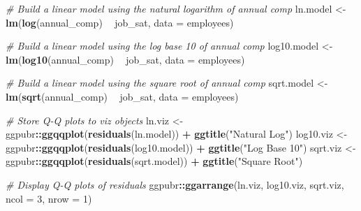 \documentclass[]{book}
\newenvironment{Shaded}{\begin{snugshade}}{\end{snugshade}}
\newcommand{\CommentTok}[1]{\textcolor[rgb]{0.56,0.35,0.01}{\textit{#1}}}
\newcommand{\DataTypeTok}[1]{\textcolor[rgb]{0.13,0.29,0.53}{#1}}
\newcommand{\DecValTok}[1]{\textcolor[rgb]{0.00,0.00,0.81}{#1}}
\newcommand{\KeywordTok}[1]{\textcolor[rgb]{0.13,0.29,0.53}{\textbf{#1}}}
\newcommand{\NormalTok}[1]{#1}
\newcommand{\OperatorTok}[1]{\textcolor[rgb]{0.81,0.36,0.00}{\textbf{#1}}}
\newcommand{\StringTok}[1]{\textcolor[rgb]{0.31,0.60,0.02}{#1}}
\begin{document}
\begin{Shaded}
\begin{Highlighting}[]
\CommentTok{# Build a linear model using the natural logarithm of annual comp}
\NormalTok{ln.model <-}\StringTok{ }\KeywordTok{lm}\NormalTok{(}\KeywordTok{log}\NormalTok{(annual_comp) }\OperatorTok{~}\StringTok{ }\NormalTok{job_sat, }\DataTypeTok{data =}\NormalTok{ employees)}

\CommentTok{# Build a linear model using the log base 10 of annual comp}
\NormalTok{log10.model <-}\StringTok{ }\KeywordTok{lm}\NormalTok{(}\KeywordTok{log10}\NormalTok{(annual_comp) }\OperatorTok{~}\StringTok{ }\NormalTok{job_sat, }\DataTypeTok{data =}\NormalTok{ employees)}

\CommentTok{# Build a linear model using the square root of annual comp}
\NormalTok{sqrt.model <-}\StringTok{ }\KeywordTok{lm}\NormalTok{(}\KeywordTok{sqrt}\NormalTok{(annual_comp) }\OperatorTok{~}\StringTok{ }\NormalTok{job_sat, }\DataTypeTok{data =}\NormalTok{ employees)}

\CommentTok{# Store Q-Q plots to viz objects}
\NormalTok{ln.viz <-}\StringTok{ }\NormalTok{ggpubr}\OperatorTok{::}\KeywordTok{ggqqplot}\NormalTok{(}\KeywordTok{residuals}\NormalTok{(ln.model)) }\OperatorTok{+}\StringTok{ }\KeywordTok{ggtitle}\NormalTok{(}\StringTok{"Natural Log"}\NormalTok{)}
\NormalTok{log10.viz <-}\StringTok{ }\NormalTok{ggpubr}\OperatorTok{::}\KeywordTok{ggqqplot}\NormalTok{(}\KeywordTok{residuals}\NormalTok{(log10.model)) }\OperatorTok{+}\StringTok{ }\KeywordTok{ggtitle}\NormalTok{(}\StringTok{"Log Base 10"}\NormalTok{)}
\NormalTok{sqrt.viz <-}\StringTok{ }\NormalTok{ggpubr}\OperatorTok{::}\KeywordTok{ggqqplot}\NormalTok{(}\KeywordTok{residuals}\NormalTok{(sqrt.model)) }\OperatorTok{+}\StringTok{ }\KeywordTok{ggtitle}\NormalTok{(}\StringTok{"Square Root"}\NormalTok{)}

\CommentTok{# Display Q-Q plots of residuals}
\NormalTok{ggpubr}\OperatorTok{::}\KeywordTok{ggarrange}\NormalTok{(ln.viz, log10.viz, sqrt.viz,}
          \DataTypeTok{ncol =} \DecValTok{3}\NormalTok{, }\DataTypeTok{nrow =} \DecValTok{1}\NormalTok{)}
\end{Highlighting}
\end{Shaded}
\end{document}
